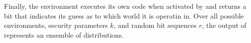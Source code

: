 Finally, the environment executes its own code when activated by  and returns a bit that indicates its guess as to which world it is operatin in.
Over all possible environments, security parameters $k$, and random bit sequences $r$, the output of  represents an ensemble of distributions. 


%

%
%
%
%

